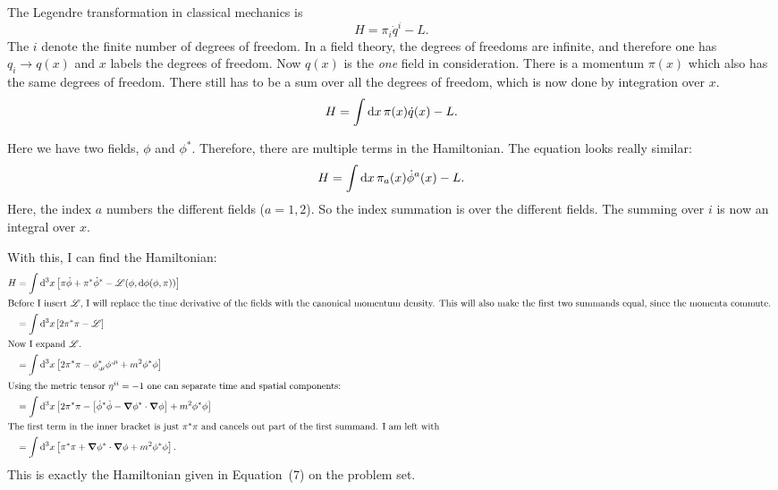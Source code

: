 \documentclass[11pt, english, fleqn, DIV=15, headinclude, BCOR=1cm]{scrartcl}
\begin{document}
The Legendre transformation in classical mechanics is
\begin{equation}
    H = \pi_i \dot q^i - L.
\end{equation}
The $i$ denote the finite number of degrees of freedom. In a field theory, the
degrees of freedoms are infinite, and therefore one has $q_i \to q(x)$ and $x$
labels the degrees of freedom. Now $q(x)$ is the \emph{one} field in
consideration. There is a momentum $\pi(x)$ which also has the same degrees of
freedom. There still has to be a sum over all the degrees of freedom, which is
now done by integration over $x$.
\begin{equation}
    H = \int \mathop{}\!\mathrm d x \, \pi(x) \dot q(x) - L.
\end{equation}

Here we have two fields, $\phi$ and $\phi^*$. Therefore, there are multiple
terms in the Hamiltonian. The equation looks really similar:
\begin{equation}
    H = \int \mathop{}\!\mathrm d x \, \pi_a(x) \dot \phi^a(x) - L.
\end{equation}
Here, the index $a$ numbers the different fields ($a = 1, 2$). So the index
summation is over the different fields. The summing over $i$ is now an integral
over $x$.

With this, I can find the Hamiltonian:
\begin{align}
    H
    &= \int \dif^3 x \sbr{\pi \dot \phi + \pi^* \dot\phi^* - \mathscr L(\phi, \dif \phi(\phi,
    \pi))} \\
    \intertext{%
        Before I insert $\mathscr L$, I will replace the time derivative of the
        fields with the canonical momentum density. This will also make the
        first two summands equal, since the momenta commute.
    }
    &= \int \dif^3 x \sbr{2 \pi^* \pi - \mathscr L} \\
    \intertext{%
        Now I expand $\mathscr L$.
    }
    &= \int \dif^3 x \sbr{2 \pi^* \pi - \phi^*_{,\mu} \phi^{,\mu} +
    m^2 \phi^* \phi} \\
    \intertext{%
        Using the metric tensor $\eta^{ii} = -1$ one can separate time and
        spatial components:
    }
    &= \int \dif^3 x \sbr{2 \pi^* \pi - \sbr{\dot \phi^* \dot \phi - \vnabla \phi^* \cdot
    \vnabla \phi} + m^2 \phi^* \phi} \\
    \intertext{%
        The first term in the inner bracket is just $\pi^* \pi$ and cancels out
        part of the first summand. I am left with
    }
    &= \int \dif^3 x \sbr{ \pi^* \pi + \vnabla \phi^* \cdot \vnabla \phi + m^2 \phi^* \phi}.
\end{align}
This is exactly the Hamiltonian given in Equation~(7) on the problem set.
\end{document}
